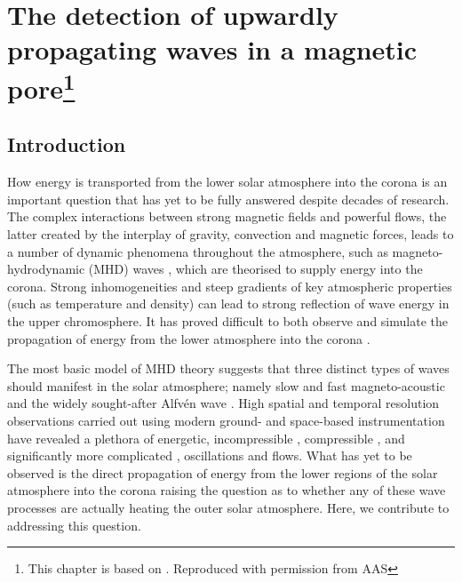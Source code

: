 \graphicspath{{Chapter5/Figs/}}

\chapter[Upwardly Propagating Waves]{The detection of upwardly propagating waves in a magnetic pore\footnote{This chapter is based on . Reproduced with permission from AAS}}
\label{chapter5}
	
   \vspace*{\fill}\par
   \pagebreak

\section{Introduction}

	How energy is transported from the lower solar atmosphere into the corona is an important question that has yet to be fully answered despite decades of research\citep{erdelyi2004heating,erdelyi2007heating,Taroyan2009}.
	The complex interactions between strong magnetic fields and powerful flows, the latter created by the interplay of gravity, convection and magnetic forces, leads to a number of dynamic phenomena throughout the atmosphere, such as magneto-hydrodynamic (MHD) waves \citep{WPMC}, which are theorised to supply energy into the corona.
	Strong inhomogeneities and steep gradients of key atmospheric properties (such as temperature and density) can lead to strong reflection of wave energy in the upper chromosphere.
	It has proved difficult to both observe \citep{Aschwanden2006,Marsh2006,Jess2009,Taroyan2009,McIntosh2011,Parnell2012,Morton2012,Wedemeyer2012,Mathioudakis2013} and simulate \citep{steiner1998,hasan2005,peter2006,erdelyi2007,ErdeyiFedun2010,Vigeesh2012} the propagation of energy from the lower atmosphere into the corona \citep{Vecchio2007,DePontieu2007,Zaqarashvili2009,DePontieu2011,mcintosh2012,Rutten2012}.

	The most basic model of MHD theory suggests that three distinct types of waves should manifest in the solar atmosphere; namely slow and fast magneto-acoustic and the widely sought-after Alfv\'en wave \citep{Banerjee2007,Jess2009,Suzuki2011,McLaughlin2011,McIntosh2011,Mathioudakis2013}.
	High spatial and temporal resolution observations carried out using modern ground- and space-based instrumentation have revealed a plethora of energetic, incompressible \citep{1999ApJ520880A,DePontieu2007,Jess2009}, compressible \citep{Morton2012}, and significantly more complicated \citep{DePontieu2011,Wedemeyer2012}, oscillations and flows.
	What has yet to be observed is the direct propagation of energy from the lower regions of the solar atmosphere into the corona raising the question as to whether any of these wave processes are actually heating the outer solar atmosphere.
    Here, we contribute to addressing this question.

